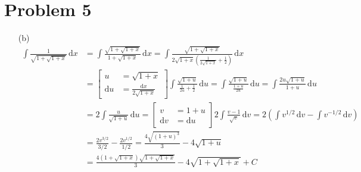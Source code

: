 \documentclass[preview, margin=0.6in]{standalone}
\newcommand*{\problem}[1]{\section*{Problem #1}}
\begin{document}
\problem{5}
\begin{itemize}
	\item[(b)]
	\begin{align*}
	    \int \frac{1}{\sqrt{1+\sqrt{1+x}}}\,\mathrm{d}x
		&=\int \frac{\sqrt{1+\sqrt{1+x}}}{1+\sqrt{1+x}}\,\mathrm{d}x
		=\int \frac{\sqrt{1+\sqrt{1+x}}}{2 \sqrt{1+x}\left(\frac{1}{2 \sqrt{1+x}}+\frac12\right)}\,\mathrm{d}x \\
		&=\left[ \begin{aligned}
			u&=\sqrt{1+x} \\
			\mathrm{d}u&=\frac{\mathrm{d}x}{2 \sqrt{1+x}}
		\end{aligned} \right]
		\int \frac{\sqrt{1+u}}{\frac{1}{2u}+\frac{1}{2}}\,\mathrm{d}u
		=\int \frac{\sqrt{1+u}}{\frac{1+u}{2u}}\,\mathrm{d}u
		=\int \frac{2u\sqrt{1+u}}{1+u}\,\mathrm{d}u \\
		&=2\int \frac{u}{\sqrt{1+u}}\,\mathrm{d}u
		=\left[ \begin{aligned}
			v&=1+u \\
			\mathrm{d}v&=\mathrm{d}u
		\end{aligned} \right]
		2 \int \frac{v-1}{\sqrt{v}}\,\mathrm{d}v
		=2\left(\int v^{1/2}\,\mathrm{d}v-\int v^{-1/2}\,\mathrm{d}v\right) \\
		&=\frac{2v^{3/2}}{3/2}-\frac{2v^{1/2}}{1/2}
		=\frac{4 \sqrt{(1+u)^3}}{3}-4 \sqrt{1+u} \\
		&=\boxed{\frac{4\left(1+\sqrt{1+x}\right)\sqrt{1+\sqrt{1+x}}}{3}-4 \sqrt{1+\sqrt{1+x}}+C}
	\end{align*}
\end{itemize}
\end{document}
